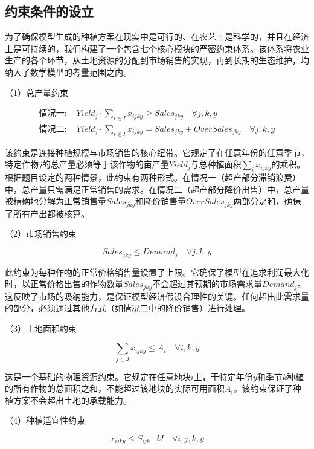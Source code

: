 \documentclass[withoutpreface,bwprint]{cumcmthesis} %
\begin{document}
\subsection{约束条件的设立}

为了确保模型生成的种植方案在现实中是可行的、在农艺上是科学的，并且在经济上是可持续的，我们构建了一个包含七个核心模块的严密约束体系。该体系将农业生产的各个环节，从土地资源的分配到市场销售的实现，再到长期的生态维护，均纳入了数学模型的考量范围之内。

（1）总产量约束


\begin{align}
	\text{情况一: } & Yield_j \cdot \sum_{i \in I} x_{ijky} \ge Sales_{jky} \quad \forall j, k, y                 \\
	\text{情况二: } & Yield_j \cdot \sum_{i \in I} x_{ijky} = Sales_{jky} + OverSales_{jky} \quad \forall j, k, y
\end{align}


该约束是连接种植规模与市场销售的核心纽带。它规定了在任意年份的任意季节，特定作物$j$的总产量必须等于该作物的亩产量$Yield_j$与总种植面积$\sum_{i} x_{ijky}$的乘积。根据题目设定的两种情景，此约束有两种形式。在情况一（超产部分滞销浪费）中，总产量只需满足正常销售的需求。在情况二（超产部分降价出售）中，总产量被精确地分解为正常销售量$Sales_{jky}$和降价销售量$OverSales_{jky}$两部分之和，确保了所有产出都被核算。

（2）市场销售约束

\begin{equation}
	Sales_{jky} \le Demand_j \quad \forall j, k, y
\end{equation}

此约束为每种作物的正常价格销售量设置了上限。它确保了模型在追求利润最大化时，以正常价格出售的作物数量$Sales_{jky}$不会超过其预期的市场需求量$Demand_j$。这反映了市场的吸纳能力，是保证模型经济假设合理性的关键。任何超出此需求量的部分，必须通过其他方式（如情况二中的降价销售）进行处理。

（3）土地面积约束

\begin{equation}
	\sum_{j \in J} x_{ijky} \le A_i \quad \forall i, k, y
\end{equation}

这是一个基础的物理资源约束。它规定在任意地块$i$上，于特定年份$y$和季节$k$种植的所有作物的总面积之和，不能超过该地块的实际可用面积$A_i$。该约束保证了种植方案不会超出土地的承载能力。

（4）种植适宜性约束

\begin{equation}
	x_{ijky} \le S_{ijk} \cdot M \quad \forall i, j, k, y
\end{equation}
\end{document}
